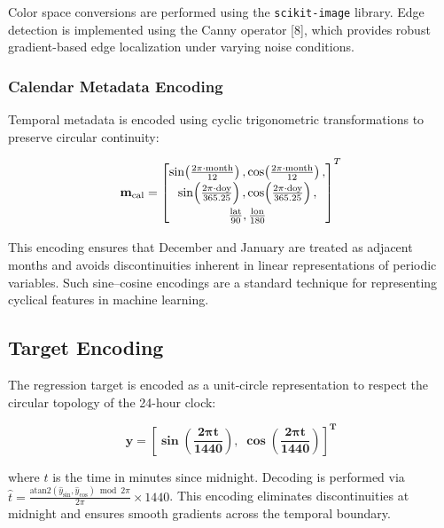 \documentclass[9pt, a4paper, twocolumn]{article}
\begin{document}
Color space conversions are performed using the \texttt{scikit-image} library. Edge detection is implemented using the Canny operator [8], which provides robust gradient-based edge localization under varying noise conditions.

\subsubsection{Calendar Metadata Encoding}

Temporal metadata is encoded using cyclic trigonometric transformations to preserve circular continuity:

\begin{equation}
{
\renewcommand{\arraystretch}{1.4}
\mathbf{m}_{\text{cal}} =
\begin{bmatrix}
\sin\!\left(\frac{2\pi \cdot \text{month}}{12}\right),
\cos\!\left(\frac{2\pi \cdot \text{month}}{12}\right), \\
\sin\!\left(\frac{2\pi \cdot \text{doy}}{365.25}\right),
\cos\!\left(\frac{2\pi \cdot \text{doy}}{365.25}\right), \\
\frac{\text{lat}}{90},
\frac{\text{lon}}{180}
\end{bmatrix}^T
}
\end{equation}

This encoding ensures that December and January are treated as adjacent months and avoids discontinuities inherent in linear representations of periodic variables. Such sine--cosine encodings are a standard technique for representing cyclical features in machine learning.

\subsection{Target Encoding}

The regression target is encoded as a unit-circle representation to respect the circular topology of the 24-hour clock:

\begin{equation}
\mathbf{y = \left[\sin\!\left(\frac{2\pi t}{1440}\right),\;
\cos\!\left(\frac{2\pi t}{1440}\right)\right]^T}
\end{equation}

where $t$ is the time in minutes since midnight. Decoding is performed via $\hat{t} = \frac{\text{atan2}(\hat{y}_{\sin}, \hat{y}_{\cos}) \bmod 2\pi}{2\pi} \times 1440$. This encoding eliminates discontinuities at midnight and ensures smooth gradients across the temporal boundary.
\end{document}
